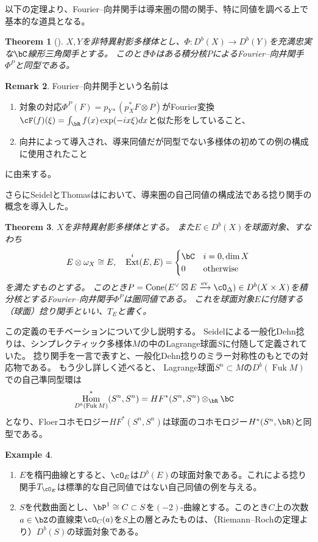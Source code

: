 \documentclass[uplatex,a4paper,dvipdfmx]{jsarticle}
\theoremstyle{plain}
\newtheorem{theorem}{Theorem}[section]
\theoremstyle{definition}
\newtheorem{example}[theorem]{Example}
\newtheorem{remark}[theorem]{Remark}
\DeclareMathOperator{\Hom}{\mathrm{Hom}}
\DeclareMathOperator{\Cone}{\mathrm{Cone}}
\DeclareMathOperator{\ev}{\mathrm{ev}}
\DeclareMathOperator{\Ext}{\mathrm{Ext}}
\DeclareMathOperator{\Fuk}{Fuk}
\begin{document}
以下の定理より、Fourier--向井関手は導来圏の間の関手、特に同値を調べる上で基本的な道具となる。
\begin{theorem}[\cite{MR1465519}]
	$X, Y$を非特異射影多様体とし、$\Phi \colon D^b(X) \to D^b(Y)$を充満忠実な$\bC$線形三角関手とする。
	このとき$\Phi$はある積分核$P$によるFourier--向井関手$\Phi^P$と同型である。
\end{theorem}
\begin{remark}
	Fourier--向井関手という名前は
	\begin{enumerate}
		\item 対象の対応$\Phi^P(F) = p_{Y*}(p_X^*F \otimes P)$がFourier変換$\cF(f)(\xi) = \int_\bR f(x)\exp(-ix\xi)dx$と似た形をしていること、
		\item 向井\cite{MR607081}によって導入され、導来同値だが同型でない多様体の初めての例の構成に使用されたこと
	\end{enumerate}
	に由来する。
\end{remark}
さらにSeidelとThomasは\cite{MR1831820}において、導来圏の自己同値の構成法である捻り関手の概念を導入した。
\begin{theorem}
	$X$を非特異射影多様体とする。
	また$E \in D^b(X)$を球面対象、すなわち\begin{equation}
		E \otimes \omega_X \cong E,\quad \Ext^i(E, E) = \begin{cases}
			\bC & i = 0, \dim X    \\
			0   & \text{otherwise}
		\end{cases}
	\end{equation}を満たすものとする。
	このとき$P = \Cone(E^\vee \boxtimes E \xrightarrow{\ev} \cO_\Delta) \in D^b(X \times X)$を積分核とするFourier--向井関手$\Phi^P$は圏同値である。
	これを球面対象$E$に付随する（球面）捻り関手といい、$T_E$と書く。
\end{theorem}
この定義のモチベーションについて少し説明する。
Seidelによる一般化Dehn捻りは、シンプレクティック多様体$M$の中のLagrange球面$S$に付随して定義されていた。
捻り関手を一言で表すと、一般化Dehn捻りのミラー対称性のもとでの対応物である。
もう少し詳しく述べると、
Lagrange球面$S^n \subset M$の$D^b(\Fuk M)$での自己準同型環は
\begin{align}
	\Hom_{D^b(\Fuk M)}^*(S^n, S^n) & = HF^*(S^n, S^n)\otimes_\bR \bC
\end{align}
となり、Floerコホモロジー$HF^*(S^n, S^n)$は球面のコホモロジー$H^*(S^n, \bR)$と同型である。

\begin{example}
	\begin{enumerate}
		\item $E$を楕円曲線とすると、$\cO_E$は$D^b(E)$の球面対象である。これによる捻り関手$T_{\cO_E}$は標準的な自己同値ではない自己同値の例を与える。
		\item $S$を代数曲面とし、$\bP^1 \cong C \subset S$を$(-2)$-曲線とする。このとき$C$上の次数$a \in \bZ$の直線束$\cO_C(a)$を$S$上の層とみたものは、（Riemann--Rochの定理より）$D^b(S)$の球面対象である。
	\end{enumerate}
\end{example}
\end{document}
